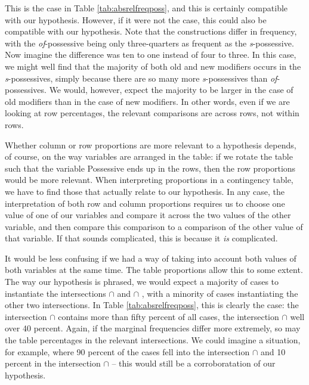 
This is the case in Table \ref{tab:absrelfreqposs}, and this is certainly compatible with our hypothesis. However, if it were not the case, this could also be compatible with our hypothesis. Note that the constructions differ in frequency, with the \textit{of}-possessive being only three-quarters as frequent as the \textit{s}-possessive. Now imagine the difference was ten to one instead of four to three. In this case, we might well find that the majority of both old and new modifiers occurs in the \textit{s}-possessives, simply because there are so many more \textit{s}-possessives than \textit{of}-possessives. We would, however, expect the majority to be larger in the case of old modifiers than in the case of new modifiers. In other words, even if we are looking at row percentages, the relevant comparisons are across rows, not within rows.

Whether column or row proportions are more relevant to a hypothesis depends, of course, on the way variables are arranged in the table: if we rotate the table such that the variable Possessive ends up in the rows, then the row proportions would be more relevant. When interpreting proportions in a contingency table, we have to find those that actually relate to our hypothesis. In any case, the interpretation of both row and column proportions requires us to choose one value of one of our variables and compare it across the two values of the other variable, and then compare this comparison to a comparison of the other value of that variable. If that sounds complicated, this is because it \textit{is} complicated.

It would be less confusing if we had a way of taking into account both values of both variables at the same time. The table proportions allow this to some extent. The way our hypothesis is phrased, we would expect a majority of cases to instantiate the intersections  $\cap$  and  $\cap$ , with a minority of cases instantiating the other two intersections. In Table \ref{tab:absrelfreqposs}, this is clearly the case: the intersection  $\cap$  contains more than fifty percent of all cases, the intersection  $\cap$  well over 40 percent. Again, if the marginal frequencies differ more extremely, so may the table percentages in the relevant intersections. We could imagine a situation, for example, where 90 percent of the cases fell into the intersection  $\cap$  and 10 percent in the intersection  $\cap$  -- this would still be a corroboratation of our hypothesis.

